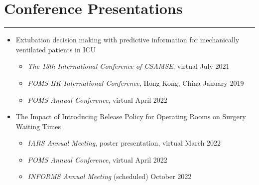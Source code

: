 \documentclass[12pt, a4paper]{article}
\begin{document}
{%

\section*{Conference Presentations}
\vspace*{0.4em}
\hrule height 0.5pt
\begin{itemize}[leftmargin=36pt, itemsep=6pt, parsep=0.2pt, topsep=1pt]

	\item Extubation decision making with predictive information for mechanically ventilated patients in ICU

	\begin{itemize}[leftmargin=20pt, itemsep=2pt, topsep=2pt]

		\item {\it The 13th International Conference of CSAMSE}, virtual \hfill July 2021

		\item {\it POMS-HK International Conference}, Hong Kong, China \hfill January 2019
		
		\item {\it POMS Annual Conference}, virtual \hfill April 2022

	\end{itemize}

	\item The Impact of Introducing Release Policy for Operating Rooms on Surgery Waiting Times

	\begin{itemize}[leftmargin=20pt, itemsep=2pt, topsep=2pt]
		
		\item {\it IARS Annual Meeting}, poster presentation, virtual \hfill March 2022

		\item {\it POMS Annual Conference}, virtual \hfill April 2022

		\item {\it INFORMS Annual Meeting} (scheduled) \hfill October 2022
	
	\end{itemize}

\end{itemize}




}
\end{document}
